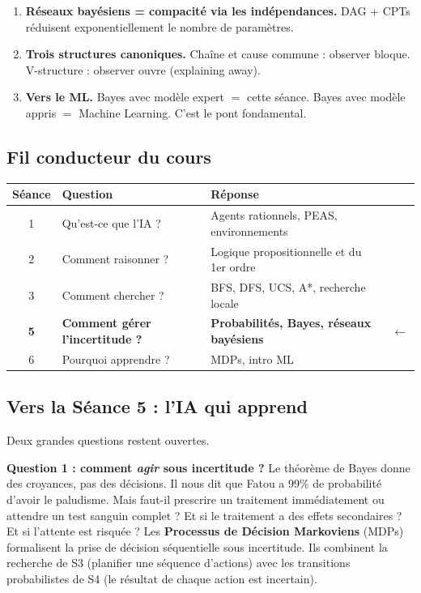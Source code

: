 \documentclass[11pt,a4paper]{article}
\newcommand{\cmark}{\ding{51}}
\begin{document}
\begin{retenirbox}
\begin{enumerate}
    \item \textbf{Réseaux bayésiens = compacité via les indépendances.} DAG + CPTs réduisent exponentiellement le nombre de paramètres.
    
    \item \textbf{Trois structures canoniques.} Chaîne et cause commune : observer bloque. V-structure : observer ouvre (explaining away).
    
    \item \textbf{Vers le ML.} Bayes avec modèle expert $=$ cette séance. Bayes avec modèle appris $=$ Machine Learning. C'est le pont fondamental.
\end{enumerate}
\end{retenirbox}

\subsection{Fil conducteur du cours}

\begin{center}
\begin{tabular}{|c|l|l|c|}
\hline
\textbf{Séance} & \textbf{Question} & \textbf{Réponse} & \\
\hline
1 & Qu'est-ce que l'IA ? & Agents rationnels, PEAS, environnements & \cmark \\
2 & Comment raisonner ? & Logique propositionnelle et du 1er ordre & \cmark \\
3 & Comment chercher ? & BFS, DFS, UCS, A*, recherche locale & \cmark \\
\textbf{5} & \textbf{Comment gérer l'incertitude ?} & \textbf{Probabilités, Bayes, réseaux bayésiens} & $\leftarrow$ \\
6 & Pourquoi apprendre ? & MDPs, intro ML & \\
\hline
\end{tabular}
\end{center}

\subsection{Vers la Séance 5 : l'IA qui apprend}

Deux grandes questions restent ouvertes.

\textbf{Question 1 : comment \textit{agir} sous incertitude ?} Le théorème de Bayes donne des croyances, pas des décisions. Il nous dit que Fatou a 99\% de probabilité d'avoir le paludisme. Mais faut-il prescrire un traitement immédiatement ou attendre un test sanguin complet ? Et si le traitement a des effets secondaires ? Et si l'attente est risquée ? Les \textbf{Processus de Décision Markoviens} (MDPs) formalisent la prise de décision séquentielle sous incertitude. Ils combinent la recherche de S3 (planifier une séquence d'actions) avec les transitions probabilistes de S4 (le résultat de chaque action est incertain).
\end{document}
